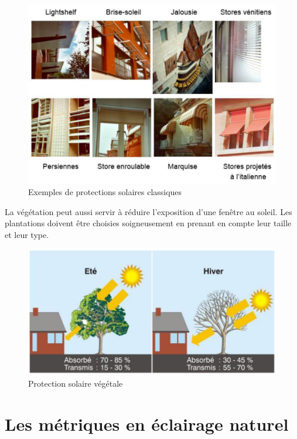 \documentclass[11pt]{report}
\begin{document}
\begin{figure}[h]
\centering
\includegraphics[width=0.8\linewidth]{type}
\caption{Exemples de protections solaires classiques}
\end{figure}


La végétation peut aussi servir à réduire l'exposition d'une fenêtre au soleil. Les plantations doivent être choisies soigneusement en prenant en compte leur taille et leur type. 

\begin{figure}[h]
\centering
\includegraphics[width=0.6\linewidth]{arbre}
\caption{Protection solaire végétale}
\end{figure}




























\newpage
\section{Les métriques en éclairage naturel}
\end{document}
